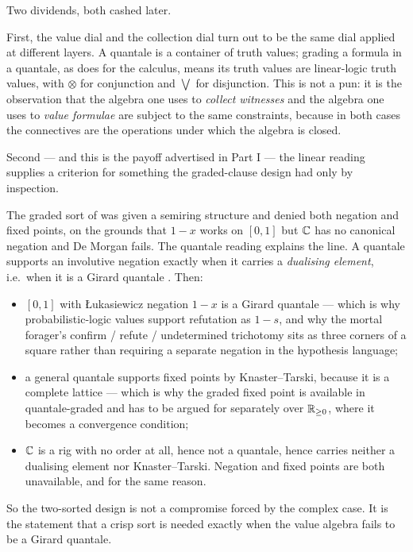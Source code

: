 Two dividends, both cashed later.

First, the value dial and the collection dial turn out to be the same dial applied
at different layers. A quantale is a container of truth values; grading a formula
in a quantale, as \cite{FuzzyRho} does for the \rhoc{} calculus, means its truth
values are linear-logic truth values, with $\otimes$ for conjunction and
$\bigvee$ for disjunction. This is not a pun: it is the observation that the
algebra one uses to \emph{collect witnesses} and the algebra one uses to
\emph{value formulae} are subject to the same constraints, because in both cases
the connectives are the operations under which the algebra is closed.

Second --- and this is the payoff advertised in Part I --- the linear reading
supplies a criterion for something the graded-clause design had only by
inspection.

\begin{observation}
\label{obs:negcriterion}
The graded sort of \cite{GradedWhere} was given a semiring structure and denied
both negation and fixed points, on the grounds that $1-x$ works on $[0,1]$ but
$\mathbb{C}$ has no canonical negation and De Morgan fails. The quantale reading explains
the line. A quantale supports an involutive negation exactly when it carries a
\emph{dualising element}, i.e.\ when it is a Girard quantale
\cite{Yetter90,Rosenthal90}. Then:
\begin{itemize}[leftmargin=1.4em]
\item $[0,1]$ with \L{}ukasiewicz negation $1-x$ is a Girard quantale --- which is
why probabilistic-logic values support refutation as $1-s$, and why the mortal
forager's confirm / refute / undetermined trichotomy sits as three corners of a
square rather than requiring a separate negation in the hypothesis language;
\item a general quantale supports fixed points by Knaster--Tarski, because it is a
complete lattice --- which is why the graded fixed point is available in
quantale-graded \rhoc{} and has to be argued for separately over $\mathbb{R}_{\ge0}$,
where it becomes a convergence condition;
\item $\mathbb{C}$ is a rig with no order at all, hence not a quantale, hence carries
neither a dualising element nor Knaster--Tarski. Negation and fixed points are
both unavailable, and for the same reason.
\end{itemize}
So the two-sorted design is not a compromise forced by the complex case. It is the
statement that a crisp sort is needed exactly when the value algebra fails to be a
Girard quantale.
\end{observation}


